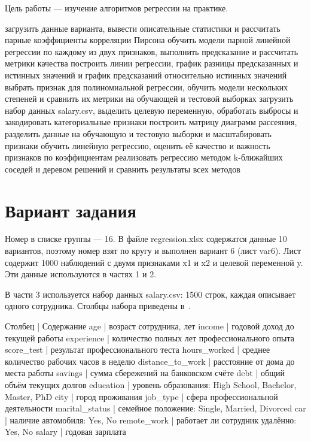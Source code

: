 \documentclass[a4paper,14pt]{extarticle}
\begin{document}
\maketitle
\suaitoc

\suaiintro

Цель работы — изучение алгоритмов регрессии на практике.

\suaitasks
загрузить данные варианта, вывести описательные статистики и рассчитать парные коэффициенты корреляции Пирсона
обучить модели парной линейной регрессии по каждому из двух признаков, выполнить предсказание и рассчитать метрики качества
построить линии регрессии, график разницы предсказанных и истинных значений и график предсказаний относительно истинных значений
выбрать признак для полиномиальной регрессии, обучить модели нескольких степеней и сравнить их метрики на обучающей и тестовой выборках
загрузить набор данных salary.csv, выделить целевую переменную, обработать выбросы и закодировать категориальные признаки
построить матрицу диаграмм рассеяния, разделить данные на обучающую и тестовую выборки и масштабировать признаки
обучить линейную регрессию, оценить её качество и важность признаков по коэффициентам
реализовать регрессию методом k-ближайших соседей и деревом решений и сравнить результаты всех методов

\section{Вариант задания}

Номер в списке группы — 16. В файле regression.xlsx содержатся данные 10 вариантов, поэтому номер взят по кругу и выполнен вариант 6 (лист var6). Лист содержит 1000 наблюдений с двумя признаками x1 и x2 и целевой переменной y. Эти данные используются в частях 1 и 2.

В части 3 используется набор данных salary.csv: 1500 строк, каждая описывает одного сотрудника. Столбцы набора приведены в~.

Столбец | Содержание
age | возраст сотрудника, лет
income | годовой доход до текущей работы
experience | количество полных лет профессионального опыта
score\_test | результат профессионального теста
hours\_worked | среднее количество рабочих часов в неделю
distance\_to\_work | расстояние от дома до места работы
savings | сумма сбережений на банковском счёте
debt | общий объём текущих долгов
education | уровень образования: High School, Bachelor, Master, PhD
city | город проживания
job\_type | сфера профессиональной деятельности
marital\_status | семейное положение: Single, Married, Divorced
car | наличие автомобиля: Yes, No
remote\_work | работает ли сотрудник удалённо: Yes, No
salary | годовая зарплата
\end{document}
